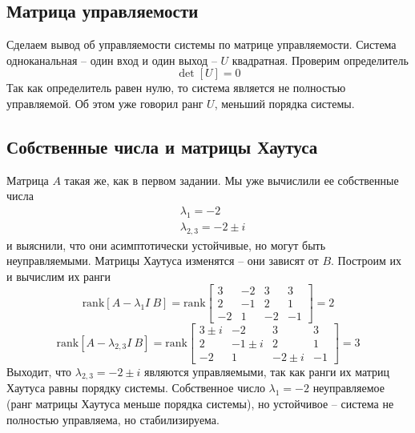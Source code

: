 \documentclass[a4paper, 12pt]{article}
\begin{document}
    \subsection{Матрица управляемости}
    Сделаем вывод об управляемости системы по матрице управляемости.
    Система одноканальная -- один вход и один выход -- $U$ квадратная. Проверим определитель
    $$\det{\left[U\right]}=0$$
    Так как определитель равен нулю, то система является не полностью управляемой.
    Об этом уже говорил ранг $U$, меньший порядка системы.


    \subsection{Собственные числа и матрицы Хаутуса}
    Матрица $A$ такая же, как в первом задании. Мы уже вычислили ее собственные числа
    \begin{align*}
        &\lambda_1=-2\\
        &\lambda_{2,3}=-2\pm i
    \end{align*}
    и выяснили, что они асимптотически устойчивые, но могут быть неуправляемыми.
    Матрицы Хаутуса изменятся -- они зависят от $B$. Построим их и вычислим их ранги
    $$
    \text{rank}\left[A-\lambda_1 I\ B\right]=\text{rank}\begin{bmatrix}
        3 &-2 &3 &3\\
        2 &-1 &2 &1\\
        -2 &1 &-2 &-1
    \end{bmatrix}=2
    $$
    $$
    \text{rank}\left[A-\lambda_{2,3} I\ B\right]=\text{rank}\begin{bmatrix}
        3\pm i &-2 &3 &3\\
        2 &-1\pm i &2 &1\\
        -2 &1 &-2\pm i &-1
    \end{bmatrix}=3
    $$
    Выходит, что $\lambda_{2,3}=-2\pm i$ являются управляемыми, так как ранги их матриц Хаутуса равны порядку системы.
    Собственное число $\lambda_1=-2$ неуправляемое (ранг матрицы Хаутуса меньше порядка системы), но устойчивое -- система не полностью управляема, но стабилизируема.
\end{document}
